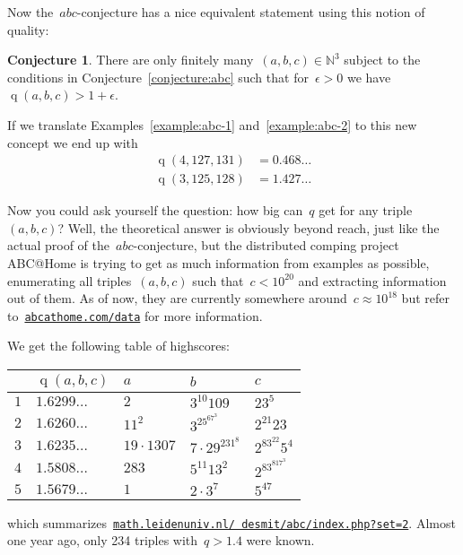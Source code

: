 \documentclass[11pt, a4paper, openany, oneside, article]{memoir}
\theoremstyle{definition}
\newtheorem{conjecture}[theorem]{Conjecture}
\DeclareMathOperator\quality{q}
\begin{document}
Now the~$abc$\nobreakdash-conjecture has a nice equivalent statement using this notion of quality:

\begin{conjecture}
  There are only finitely many~$(a,b,c)\in\mathbb{N}^3$ subject to the conditions in Conjecture~\ref{conjecture:abc} such that for~$\epsilon>0$ we have~$\quality(a,b,c)>1+\epsilon$.
\end{conjecture}

If we translate Examples~\ref{example:abc-1} and~\ref{example:abc-2} to this new concept we end up with
\begin{equation}
  \begin{aligned}
    \quality(4,127,131)&=0.468\ldots \\
    \quality(3,125,128)&=1.427\ldots
  \end{aligned}
\end{equation}

Now you could ask yourself the question: how big can~$q$ get for any triple~$(a,b,c)$? Well, the theoretical answer is obviously beyond reach, just like the actual proof of the~$abc$\nobreakdash-con\-jecture, but  the distributed comping project ABC@Home is trying to get as much information from examples as possible, enumerating all triples~$(a,b,c)$ such that~$c<10^{20}$ and extracting information out of them. As of now, they are currently somewhere around~$c\approx10^{18}$ but refer to~\href{http://abcathome.com/data/}{\texttt{abcathome.com/data}} for more information.

We get the following table of highscores:

\begin{center}
  \begin{tabular}{cllll}
     & $\quality(a,b,c)$ & $a$ & $b$ & $c$ \\\midrule
    $1$ & $1.6299\ldots$ & $2$ & $3^{10}109$ & $23^5$ \\
    $2$ & $1.6260\ldots$ & $11^2$ & $3^25^67^3$ & $2^{21}23$ \\
    $3$ & $1.6235\ldots$ & $19\cdot1307$ & $7\cdot29^231^8$ & $2^83^{22}5^4$ \\
    $4$ & $1.5808\ldots$ & $283$ & $5^{11}13^2$ & $2^83^817^3$ \\
    $5$ & $1.5679\ldots$ & $1$ & $2\cdot3^7$ & $5^47$ \\
  \end{tabular}
\end{center}

which summarizes~\href{http://www.math.leidenuniv.nl/~desmit/abc/index.php?set=2}{\texttt{math.leidenuniv.nl/~desmit/abc/index.php?set=2}}. Almost one year ago, only 234 triples with~$q>1.4$ were known.
\end{document}
